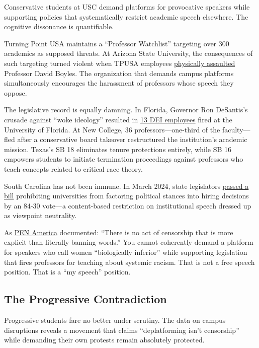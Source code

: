 \documentclass[11pt]{article}
\begin{document}
Conservative students at USC demand platforms for provocative speakers while supporting policies that systematically restrict academic speech elsewhere. The cognitive dissonance is quantifiable.

Turning Point USA maintains a ``Professor Watchlist'' targeting over 300 academics as supposed threats. At Arizona State University, the consequences of such targeting turned violent when TPUSA employees \href{https://www.insidehighered.com/news/2017/12/19/arizona-state-student-events-official-assaulted-political-group}{physically assaulted} Professor David Boyles. The organization that demands campus platforms simultaneously encourages the harassment of professors whose speech they oppose.

The legislative record is equally damning. In Florida, Governor Ron DeSantis's crusade against ``woke ideology'' resulted in \href{https://pen.org/report/educational-gag-orders/}{13 DEI employees} fired at the University of Florida. At New College, 36 professors---one-third of the faculty---fled after a conservative board takeover restructured the institution's academic mission. Texas's SB 18 eliminates tenure protections entirely, while SB 16 empowers students to initiate termination proceedings against professors who teach concepts related to critical race theory.

South Carolina has not been immune. In March 2024, state legislators \href{https://www.scstatehouse.gov/sess125_2023-2024/bills/3728.htm}{passed a bill} prohibiting universities from factoring political stances into hiring decisions by an 84-30 vote---a content-based restriction on institutional speech dressed up as viewpoint neutrality.

As \href{https://pen.org/report/educational-gag-orders/}{PEN America} documented: ``There is no act of censorship that is more explicit than literally banning words.'' You cannot coherently demand a platform for speakers who call women ``biologically inferior'' while supporting legislation that fires professors for teaching about systemic racism. That is not a free speech position. That is a ``my speech'' position.

\subsection{The Progressive Contradiction}

Progressive students fare no better under scrutiny. The data on campus disruptions reveals a movement that claims ``deplatforming isn't censorship'' while demanding their own protests remain absolutely protected.
\end{document}
